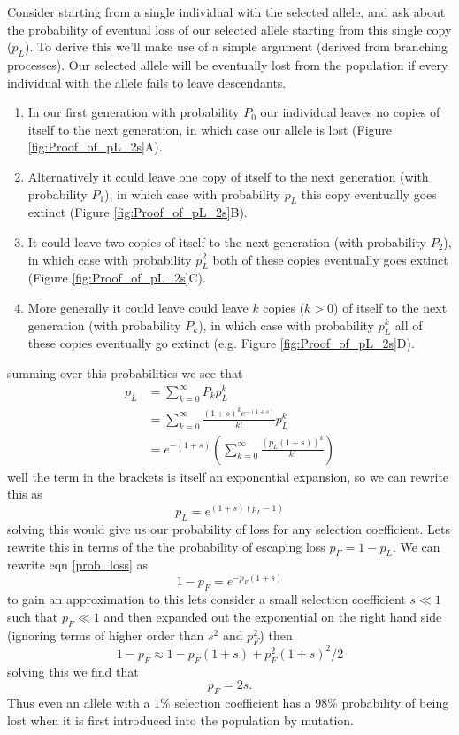 Consider starting from a single individual with the selected allele, and ask
about the probability of eventual loss of our selected allele starting
from this single copy ($p_L$). To derive this we'll make use of a
simple argument (derived from branching processes). Our selected
allele will be eventually lost from the population if every individual
with the allele fails to leave descendants.
\begin{enumerate}
\item In our first generation
with probability $P_0$ our individual leaves no copies of itself to
the next generation, in which case our allele is lost (Figure \ref{fig:Proof_of_pL_2s}A).
\item Alternatively
it could leave one copy of itself to the next generation (with
probability $P_1$), in which
case with probability $p_L$ this copy eventually goes extinct (Figure \ref{fig:Proof_of_pL_2s}B).
\item It could leave two copies of itself to the next generation (with
probability $P_2$), in which
case with probability $p_L^2$ both of these copies eventually goes
extinct (Figure \ref{fig:Proof_of_pL_2s}C).
\item More generally it could leave could leave $k$ copies ($k>0$) of itself to the next generation (with
probability $P_k$), in which case with probability $p_L^k$  all of
these copies eventually go extinct (e.g. Figure \ref{fig:Proof_of_pL_2s}D).
\end{enumerate}
summing over this probabilities we see that
\begin{eqnarray}
p_L &= \sum_{k=0}^{\infty} P_k p_L^{k}  \nonumber \\
&=  \sum_{k=0}^{\infty} \frac{(1+s)^ke^{-(1+s)}}{k!} p_L^{k} \nonumber
\\
&= e^{-(1+s)} \left( \sum_{k=0}^{\infty} \frac{\left(p_L(1+s) \right)^k}{k!}  \right)
\end{eqnarray}
well the term in the brackets is itself an exponential expansion, so
we can rewrite this as
\begin{equation}
p_L = e^{(1+s)(p_L-1)} \label{prob_loss}
\end{equation}
solving this would give us our probability of loss for any selection
coefficient. Lets
rewrite this in terms of the the probability of escaping loss $p_F = 1-p_L$.  We can
rewrite eqn \eqref{prob_loss} as
\begin{equation}
1-p_F = e^{-p_F(1+s)}
\end{equation}
to gain an approximation to this lets consider a small selection
coefficient $s \ll 1$ such that $p_F \ll 1$ and then expanded out the
exponential on the right hand side (ignoring terms of higher
order than $s^2$ and $p_F^2$) then
\begin{equation}
1-p_F \approx 1-p_F(1+s)+p_F^2(1+s)^2/2
\end{equation}
solving this we find that
\begin{equation}
p_F = 2s.
\end{equation}
Thus even an allele with a $1\%$ selection coefficient has a $98\%$
probability of being lost when it is first introduced into the
population by mutation. \\

